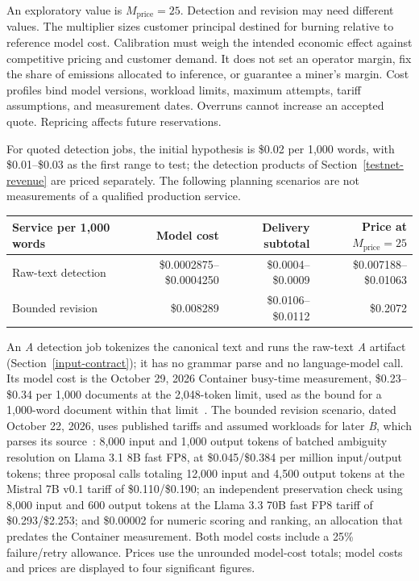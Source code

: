 An exploratory value is \(M_{\mathrm{price}}=25\). Detection and revision may need different
values. The multiplier sizes customer principal destined for burning relative
to reference model cost. Calibration must weigh the intended economic effect
against competitive pricing and customer demand. It does not set an operator
margin, fix the share of emissions allocated to inference, or guarantee a
miner's margin. Cost profiles bind model versions, workload limits,
maximum attempts, tariff assumptions, and measurement dates. Overruns cannot
increase an accepted quote. Repricing affects future reservations.

For quoted detection jobs, the initial hypothesis is \$0.02 per 1,000 words,
with \$0.01--\$0.03 as the first range to test; the detection products of
Section~\ref{testnet-revenue} are priced separately. The following planning
scenarios are not measurements of a qualified production service.

\begin{center}
\small
\begin{tabularx}{\linewidth}{Lrrr}
\toprule
Service per 1,000 words & Model cost & Delivery subtotal & Price at \(M_{\mathrm{price}}=25\) \\
\midrule
Raw-text detection & \$0.0002875--\$0.0004250 & \$0.0004--\$0.0009 & \$0.007188--\$0.01063 \\
Bounded revision & \$0.008289 & \$0.0106--\$0.0112 & \$0.2072 \\
\bottomrule
\end{tabularx}
\end{center}

An \textit{A} detection job tokenizes the canonical text and runs the raw-text
\textit{A} artifact (Section~\ref{input-contract}); it has no grammar parse and
no language-model call. Its model cost is the October 29, 2026 Container
busy-time measurement, \$0.23--\$0.34 per 1,000 documents at the 2,048-token
limit, used as the bound for a 1,000-word document within that
limit~\cite{containerserving}. The bounded revision scenario, dated October 22,
2026, uses published tariffs and assumed workloads for later \textit{B}, which
parses its source~\cite{cfpricing}: 8,000 input and 1,000 output tokens of
batched ambiguity resolution on Llama 3.1 8B fast FP8, at \$0.045/\$0.384 per
million input/output tokens; three proposal calls totaling 12,000 input and
4,500 output tokens at the Mistral 7B v0.1 tariff of \$0.110/\$0.190; an
independent preservation check using 8,000 input and 600 output tokens at the
Llama 3.3 70B fast FP8 tariff of \$0.293/\$2.253; and \$0.00002 for numeric
scoring and ranking, an allocation that predates the Container measurement.
Both model costs include a 25\% failure/retry allowance. Prices use the
unrounded model-cost totals; model costs and prices are displayed to four
significant figures.

